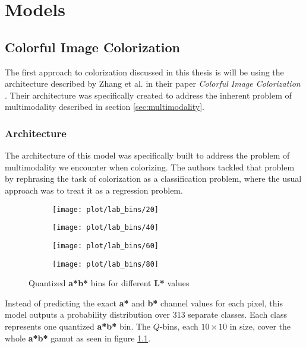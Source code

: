 \chapter{Models}


\section{Colorful Image Colorization}
\label{sec:colorful}

The first approach to colorization discussed in this thesis is will be using
the architecture described by Zhang et al. in their paper \textit{Colorful Image Colorization} 
\citep{zhang2016colorful}. Their architecture was specifically created to 
address the inherent problem of multimodality described in section \ref{sec:multimodality}.

\subsection{Architecture}
\label{sec:colorful_architecture}

The architecture of this model was specifically built to address the problem
of multimodality we encounter when colorizing. The authors tackled that problem 
by rephrasing the task of colorization as a classification problem, where the 
usual approach was to treat it as a regression problem.

\begin{figure}[!ht]
	\centering
	\begin{subfigure}{.24\textwidth}
		\centering
		\texttt{[image: plot/lab\_bins/20]}
	\end{subfigure}
	\begin{subfigure}{.24\textwidth}
		\centering
		\texttt{[image: plot/lab\_bins/40]}
	\end{subfigure}
	\begin{subfigure}{.24\textwidth}
		\centering
		\texttt{[image: plot/lab\_bins/60]}
	\end{subfigure}
	\begin{subfigure}{.24\textwidth}
		\centering
		\texttt{[image: plot/lab\_bins/80]}
	\end{subfigure}
    \caption{Quantized \textbf{a*b*} bins for different \textbf{L*} values}
	\label{fig:lab_bins}
\end{figure}

Instead of predicting the exact \textbf{a*} and \textbf{b*} channel values 
for each pixel, this model outputs a probability distribution over 313 separate classes. 
Each class represents one quantized \textbf{a*b*} bin. 
The $Q$-bins, each $10\times10$ in size, cover the whole \textbf{a*b*} gamut as seen
in figure \ref{fig:lab_bins}.


